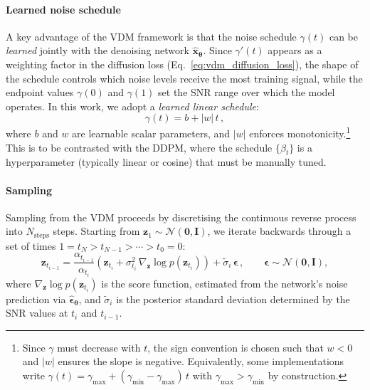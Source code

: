 \paragraph{Learned noise schedule}
\label{sec:vdm_schedule}

A key advantage of the VDM framework is that the noise schedule $\gamma(t)$ can be \emph{learned} jointly with the denoising network $\hat{\bm{x}}_{\bm{\theta}}$. Since $\gamma'(t)$ appears as a weighting factor in the diffusion loss (Eq.~\ref{eq:vdm_diffusion_loss}), the shape of the schedule controls which noise levels receive the most training signal, while the endpoint values $\gamma(0)$ and $\gamma(1)$ set the SNR range over which the model operates. In this work, we adopt a \emph{learned linear schedule}:
\begin{equation}
    \gamma(t) = b + |w|\,t\,,
    \label{eq:learned_linear}
\end{equation}
where $b$ and $w$ are learnable scalar parameters, and $|w|$ enforces monotonicity.\footnote{Since $\gamma$ must decrease with $t$, the sign convention is chosen such that $w < 0$ and $|w|$ ensures the slope is negative. Equivalently, some implementations write $\gamma(t) = \gamma_{\max} + (\gamma_{\min} - \gamma_{\max})\,t$ with $\gamma_{\max} > \gamma_{\min}$ by construction.} This is to be contrasted with the DDPM, where the schedule $\{\beta_t\}$ is a hyperparameter (typically linear or cosine) that must be manually tuned.


\paragraph{Sampling}
\label{sec:vdm_sampling}

Sampling from the VDM proceeds by discretising the continuous reverse process into $N_{\mathrm{steps}}$ steps. Starting from $\bm{z}_1 \sim \mathcal{N}(\bm{0},\bm{I})$, we iterate backwards through a set of times $1 = t_{N} > t_{N-1} > \cdots > t_0 = 0$:
\begin{equation}
    \bm{z}_{t_{i-1}} = \frac{\alpha_{t_{i-1}}}{\alpha_{t_i}}\left(\bm{z}_{t_i} + \sigma_{t_i}^2\,\nabla_{\bm{z}}\log p(\bm{z}_{t_i})\right) + \tilde{\sigma}_{i}\,\bm{\epsilon}\,, \qquad \bm{\epsilon} \sim \mathcal{N}(\bm{0},\bm{I}),
    \label{eq:reverse_step}
\end{equation}
where $\nabla_{\bm{z}}\log p(\bm{z}_{t_i})$ is the score function, estimated from the network's noise prediction via $\hat{\bm{\epsilon}}_{\bm{\theta}}$, and $\tilde{\sigma}_i$ is the posterior standard deviation determined by the SNR values at $t_i$ and $t_{i-1}$.

